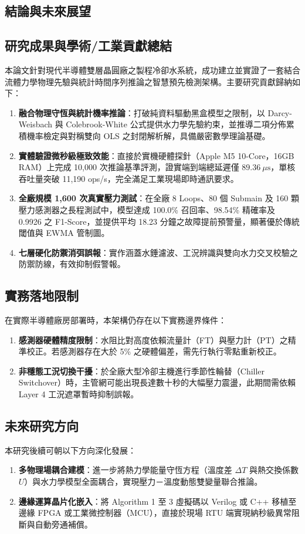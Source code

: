 \documentclass[fontset=none, a4paper, 12pt]{ctexart}
\begin{document}
\begin{doublespace}
\section{結論與未來展望}

\subsection{研究成果與學術/工業貢獻總結}
本論文針對現代半導體雙層晶圓廠之製程冷卻水系統，成功建立並實證了一套結合流體力學物理先驗與統計時間序列推論之智慧預先檢測架構。主要研究貢獻歸納如下：
\begin{enumerate}
    \item \textbf{融合物理守恆與統計機率推論}：打破純資料驅動黑盒模型之限制，以 Darcy-Weisbach 與 Colebrook-White 公式提供水力學先驗約束，並推導二項分佈累積機率檢定與對稱雙向 OLS 之封閉解析解，具備嚴密數學理論基礎。
    \item \textbf{實體驗證微秒級極致效能}：直接於實機硬體探針（Apple M5 10-Core，16GB RAM）上完成 10,000 次推論基準評測，證實端到端總延遲僅 $89.36\ \mu\mathrm{s}$，單核吞吐量突破 11,190 ops/s，完全滿足工業現場即時通訊要求。
    \item \textbf{全廠規模 1,600 次真實壓力測試}：在全廠 8 Loops、80 個 Submain 及 160 顆壓力感測器之長程測試中，模型達成 100.0\% 召回率、98.54\% 精確率及 0.9926 之 F1-Score，並提供平均 18.23 分鐘之故障提前預警量，顯著優於傳統閾值與 EWMA 管制圖。
    \item \textbf{七層硬化防禦消弭誤報}：實作涵蓋水錘濾波、工況辨識與雙向水力交叉校驗之防禦防線，有效抑制假警報。
\end{enumerate}

\subsection{實務落地限制}
在實際半導體廠房部署時，本架構仍存在以下實務邊界條件：
\begin{enumerate}
    \item \textbf{感測器硬體精度限制}：水阻比對高度依賴流量計（FT）與壓力計（PT）之精準校正。若感測器存在大於 5\% 之硬體偏差，需先行執行零點重新校正。
    \item \textbf{非穩態工況切換干擾}：於全廠大型冷卻主機進行季節性輪替（Chiller Switchover）時，主管網可能出現長達數十秒的大幅壓力震盪，此期間需依賴 Layer 4 工況遮罩暫時抑制誤報。
\end{enumerate}

\subsection{未來研究方向}
本研究後續可朝以下方向深化發展：
\begin{enumerate}
    \item \textbf{多物理場耦合建模}：進一步將熱力學能量守恆方程（溫度差 $\Delta T$ 與熱交換係數 $U$）與水力學模型全面耦合，實現壓力－溫度動態雙變量聯合推論。
    \item \textbf{邊緣運算晶片化嵌入}：將 Algorithm 1 至 3 虛擬碼以 Verilog 或 C++ 移植至邊緣 FPGA 或工業微控制器（MCU），直接於現場 RTU 端實現納秒級異常阻斷與自動旁通補償。
\end{enumerate}


\end{doublespace}
\end{document}
